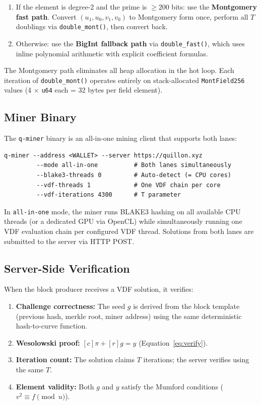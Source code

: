 \documentclass[11pt,a4paper]{article}
\begin{document}
\begin{enumerate}
    \item If the element is degree-2 and the prime is $\geq 200$ bits: use the \textbf{Montgomery fast path}. Convert $(u_1, u_0, v_1, v_0)$ to Montgomery form once, perform all $T$ doublings via \texttt{double\_mont()}, then convert back.
    \item Otherwise: use the \textbf{BigInt fallback path} via \texttt{double\_fast()}, which uses inline polynomial arithmetic with explicit coefficient formulas.
\end{enumerate}

The Montgomery path eliminates all heap allocation in the hot loop. Each iteration of \texttt{double\_mont()} operates entirely on stack-allocated \texttt{MontField256} values (4 $\times$ \texttt{u64} each = 32 bytes per field element).

\subsection{Miner Binary}

The \texttt{q-miner} binary is an all-in-one mining client that supports both lanes:

\begin{lstlisting}[language={},frame=single,basicstyle=\ttfamily\footnotesize]
q-miner --address <WALLET> --server https://quillon.xyz
         --mode all-in-one          # Both lanes simultaneously
         --blake3-threads 0         # Auto-detect (= CPU cores)
         --vdf-threads 1            # One VDF chain per core
         --vdf-iterations 4300      # T parameter
\end{lstlisting}

In \texttt{all-in-one} mode, the miner runs BLAKE3 hashing on all available CPU threads (or a dedicated GPU via OpenCL) while simultaneously running one VDF evaluation chain per configured VDF thread. Solutions from both lanes are submitted to the server via HTTP POST.

\subsection{Server-Side Verification}

When the block producer receives a VDF solution, it verifies:

\begin{enumerate}
    \item \textbf{Challenge correctness:} The seed $g$ is derived from the block template (previous hash, merkle root, miner address) using the same deterministic hash-to-curve function.
    \item \textbf{Wesolowski proof:} $[c]\pi + [r]g = y$ (Equation~\ref{eq:verify}).
    \item \textbf{Iteration count:} The solution claims $T$ iterations; the server verifies using the same $T$.
    \item \textbf{Element validity:} Both $g$ and $y$ satisfy the Mumford conditions ($v^2 \equiv f \pmod{u}$).
\end{enumerate}
\end{document}
